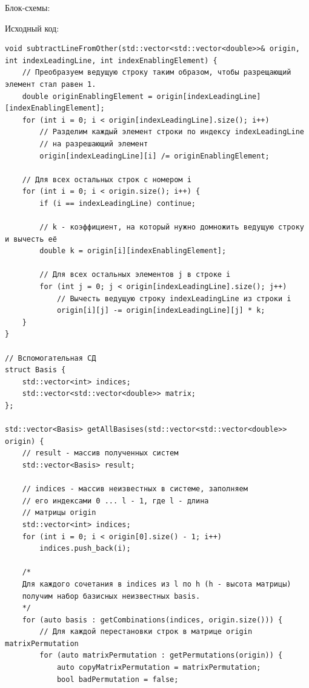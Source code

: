 \documentclass[a4paper,14pt]{extarticle}
\begin{document}
Блок-схемы:
\begin{center}
    
    
    
\end{center}
Исходный код:
\begin{verbatim}
void subtractLineFromOther(std::vector<std::vector<double>>& origin, int indexLeadingLine, int indexEnablingElement) {
    // Преобразуем ведущую строку таким образом, чтобы разрещающий элемент стал равен 1.
    double originEnablingElement = origin[indexLeadingLine][indexEnablingElement];
    for (int i = 0; i < origin[indexLeadingLine].size(); i++) 
        // Разделим каждый элемент строки по индексу indexLeadingLine
        // на разрешающий элемент
        origin[indexLeadingLine][i] /= originEnablingElement;
    
    // Для всех остальных строк с номером i
    for (int i = 0; i < origin.size(); i++) {
        if (i == indexLeadingLine) continue;

        // k - коэффициент, на который нужно домножить ведущую строку и вычесть её
        double k = origin[i][indexEnablingElement];

        // Для всех остальных элементов j в строке i
        for (int j = 0; j < origin[indexLeadingLine].size(); j++)
            // Вычесть ведущую строку indexLeadingLine из строки i
            origin[i][j] -= origin[indexLeadingLine][j] * k;
    }
}

// Вспомогательная СД
struct Basis {
    std::vector<int> indices;
    std::vector<std::vector<double>> matrix;
};

std::vector<Basis> getAllBasises(std::vector<std::vector<double>> origin) {
    // result - массив полученных систем 
    std::vector<Basis> result;

    // indices - массив неизвестных в системе, заполняем
    // его индексами 0 ... l - 1, где l - длина 
    // матрицы origin
    std::vector<int> indices;
    for (int i = 0; i < origin[0].size() - 1; i++) 
        indices.push_back(i);
    
    /*
    Для каждого сочетания в indices из l по h (h - высота матрицы) 
    получим набор базисных неизвестных basis.
    */
    for (auto basis : getCombinations(indices, origin.size())) {
        // Для каждой перестановки строк в матрице origin matrixPermutation
        for (auto matrixPermutation : getPermutations(origin)) {
            auto copyMatrixPermutation = matrixPermutation;
            bool badPermutation = false;
            

\end{verbatim}
\end{document}
